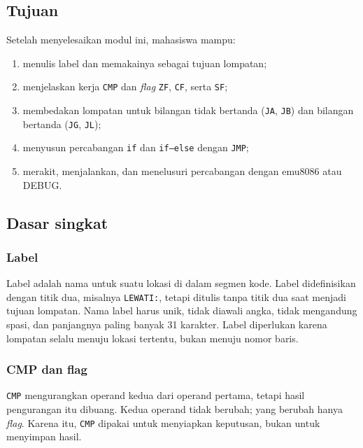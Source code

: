 
\subsection{Tujuan}

\begin{tujuan}
Setelah menyelesaikan modul ini, mahasiswa mampu:
\begin{enumerate}
    \item menulis label dan memakainya sebagai tujuan lompatan;
    \item menjelaskan kerja \texttt{CMP} dan \emph{flag} \texttt{ZF},
          \texttt{CF}, serta \texttt{SF};
    \item membedakan lompatan untuk bilangan tidak bertanda
          (\texttt{JA}, \texttt{JB}) dan bilangan bertanda
          (\texttt{JG}, \texttt{JL});
    \item menyusun percabangan \texttt{if} dan \texttt{if--else}
          dengan \texttt{JMP};
    \item merakit, menjalankan, dan menelusuri percabangan dengan
          emu8086 atau DEBUG.
\end{enumerate}
\end{tujuan}

\subsection{Dasar singkat}

\subsubsection*{Label}

Label adalah nama untuk suatu lokasi di dalam segmen kode. Label
didefinisikan dengan titik dua, misalnya \texttt{LEWATI:}, tetapi
ditulis tanpa titik dua saat menjadi tujuan lompatan. Nama label
harus unik, tidak diawali angka, tidak mengandung spasi, dan panjangnya
paling banyak 31 karakter. Label diperlukan karena lompatan selalu
menuju lokasi tertentu, bukan menuju nomor baris.

\subsubsection*{CMP dan flag}

\texttt{CMP} mengurangkan operand kedua dari operand pertama, tetapi
hasil pengurangan itu dibuang. Kedua operand tidak berubah; yang
berubah hanya \emph{flag}. Karena itu, \texttt{CMP} dipakai untuk
menyiapkan keputusan, bukan untuk menyimpan hasil.

